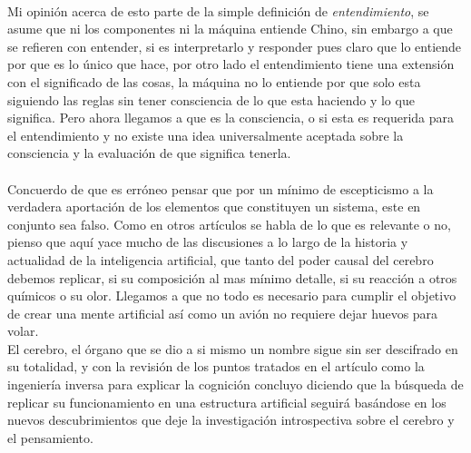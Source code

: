 \documentclass[12pt]{article}
\begin{document}
	\\
	Mi opinión acerca de esto parte de la simple definición de \textit{entendimiento}, se asume que ni los componentes ni la máquina entiende Chino, sin embargo a que se refieren con entender, si es interpretarlo y responder pues claro que lo entiende por que es lo único que hace, por otro lado el entendimiento tiene una extensión con el significado de las cosas, la máquina no lo entiende por que solo esta siguiendo las reglas sin tener consciencia de lo que esta haciendo y lo que significa. Pero ahora llegamos a que es la consciencia, o si esta es requerida para el entendimiento y no existe una idea universalmente aceptada sobre la consciencia y la evaluación de que significa tenerla.\\\\ Concuerdo de que es erróneo pensar que por un mínimo de escepticismo a la verdadera aportación de los elementos que constituyen un sistema, este en conjunto sea falso. 
	Como en otros artículos se habla de lo que es relevante o no, pienso que aquí yace mucho de las discusiones a lo largo de la historia y actualidad de la inteligencia artificial, que tanto del poder causal del cerebro debemos replicar, si su composición al mas mínimo detalle, si su reacción a otros químicos o su olor. Llegamos a que no todo es necesario para cumplir el objetivo de crear una mente artificial así como un avión no requiere dejar huevos para volar. 
	\\
	El cerebro, el órgano que se dio a si mismo un nombre sigue sin ser descifrado en su totalidad, y con la revisión de los puntos tratados en el artículo como la ingeniería inversa para explicar la cognición concluyo diciendo que la búsqueda de replicar su funcionamiento en una estructura artificial seguirá basándose en los nuevos descubrimientos que deje la investigación introspectiva sobre el cerebro y el pensamiento. 
	
 
\end{document}
